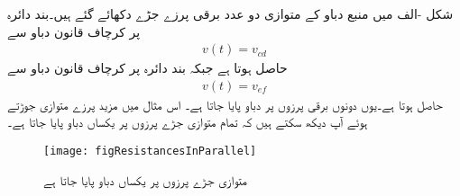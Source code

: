 شکل -الف میں منبع دباو کے متوازی دو عدد برقی پرزے جڑے دکھائے گئے ہیں۔بند دائرہ  پر کرچاف قانون دباو سے
\begin{align}
v(t)=v_{cd}
\end{align}
حاصل ہوتا ہے جبکہ بند دائرہ  پر کرچاف  قانون دباو سے
\begin{align}
v(t)=v_{ef}
\end{align}
حاصل ہوتا ہے۔یوں دونوں برقی پرزوں پر  دباو پایا جاتا ہے۔ اس مثال میں مزید پرزے متوازی جوڑتے ہوئے آپ دیکھ سکتے ہیں کہ تمام متوازی جڑے پرزوں پر یکساں دباو پایا جاتا ہے۔
\begin{figure}
\centering
\texttt{[image: figResistancesInParallel]}
\caption{متوازی جڑے پرزوں پر یکساں دباو پایا جاتا ہے}
\label{شکل_مزاحمتی_متوازی_جڑے_پرزے}
\end{figure}

